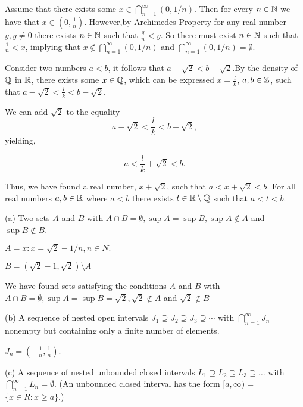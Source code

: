 \documentclass{report}
\begin{document}
\par \bigskip


Assume that there exists some $x \in \bigcap_{n=1}^{\infty}(0,1 / n).$ Then for every $n \in \NN$ we have that $ x \in (0, \frac{1}{n})$. However,by Archimedes Property for any real number  $y, y\not= 0$ there exists $n \in \NN$ such that $\frac{q}{n} < y$. So there must exist $n \in \NN$ such that $\frac{1}{n} < x$, implying that $x \not\in \bigcap_{n=1}^{\infty}(0,1 / n)$ and $\bigcap_{n=1}^{\infty}(0,1 / n) = \emptyset.$


\sol Consider two numbers $a <b$, it follows that $a - \sqrt{2} < b - \sqrt{2}.$By the density of $\QQ$ in $\RR$, there exists some $x \in \QQ$, which can be expressed $x= \frac{l}{k}$, $a,b \in \ZZ$, such that $a - \sqrt{2} < \frac{l}{k}< b - \sqrt{2}$.

We can add $\sqrt{2}$ to the equality 
$$
a - \sqrt{2} < \frac{l}{k}< b - \sqrt{2}
,$$ yielding, 

$$
a < \frac{l}{k}+ \sqrt{2} < b 
.$$ 

Thus, we have found a real number, $x + \sqrt{2}$, such that $a < x + \sqrt{2}< b.$ For all real numbers $a, b \in \RR$ where $a < b$ there exists $t \in \RR \setminus \QQ$ such that $a<t<b.$


(a) Two sets $A$ and $B$ with $A \cap B=\emptyset, \sup A=\sup B, \sup A \notin A$ and $\sup B \notin B$.

\par \bigskip 
$ A = { x : x = \sqrt{2} - 1/n, n \in N }.$ \par $B = (\sqrt{2} -1,\sqrt{2}) \setminus A$ 
\par We have found sets satisfying the conditions $A$ and $B$ with $A \cap B=\emptyset, \sup A=\sup B = \sqrt{2}, \sqrt{2} \notin A$ and $\sqrt{2} \notin B$


\par \bigskip
(b) A sequence of nested open intervals $J_1 \supseteq J_2 \supseteq J_3 \supseteq \cdots$ with $\bigcap_{n=1}^{\infty} J_n$ nonempty but containing only a finite number of elements.
\par \bigskip 
$J_n = (-\frac{1}{n}, \frac{1}{n})$.
\par \bigskip
(c) A sequence of nested unbounded closed intervals $L_1 \supseteq L_2 \supseteq L_3 \supseteq \ldots$ with $\bigcap_{n=1}^{\infty} L_n=\emptyset$. (An unbounded closed interval has the form $[a, \infty)=$ $\{x \in R: x \geq a\}$.)
\bigskip
\end{document}
